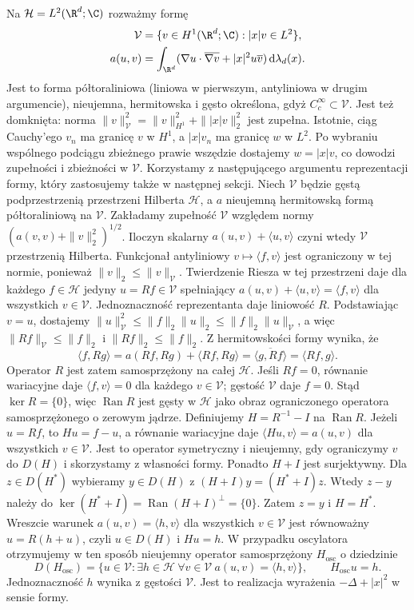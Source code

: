 \begin{przyklad}
Na $\mathcal H=L^2(\R^d;\C)$ rozważmy formę
\[
 \begin{split}
 \mathcal V&=\{v\in H^1(\R^d;\C): |x|v\in L^2\},\\
 a(u,v)&=\int_{\R^d}
   (\nabla u\cdot\overline{\nabla v}+|x|^2u\overline v)
       \,\mathrm d\lambda_d(x).
 \end{split}
\]
Jest to forma półtoraliniowa (liniowa w pierwszym,
antyliniowa w drugim argumencie), nieujemna,
hermitowska i gęsto określona,
gdyż $C_c^\infty\subset\mathcal V$.
Jest też domknięta: norma
$\|v\|_{\mathcal V}^2=\|v\|_{H^1}^2+\||x|v\|_2^2$
jest zupełna. Istotnie, ciąg Cauchy'ego $v_n$
ma granicę $v$ w $H^1$, a $|x|v_n$ ma granicę
$w$ w $L^2$. Po wybraniu wspólnego podciągu
zbieżnego prawie wszędzie dostajemy $w=|x|v$,
co dowodzi zupełności i zbieżności w $\mathcal V$.
Korzystamy z następującego argumentu reprezentacji
formy, który zastosujemy także w następnej sekcji.
Niech $\mathcal V$ będzie gęstą podprzestrzenią
przestrzeni Hilberta $\mathcal H$, a $a$ nieujemną
hermitowską formą półtoraliniową na $\mathcal V$.
Zakładamy zupełność $\mathcal V$ względem normy
$(a(v,v)+\|v\|_2^2)^{1/2}$. Iloczyn skalarny
$a(u,v)+\langle u,v\rangle$ czyni wtedy
$\mathcal V$ przestrzenią Hilberta.
Funkcjonał antyliniowy $v\mapsto\langle f,v\rangle$
jest ograniczony w tej normie, ponieważ
$\|v\|_2\le\|v\|_{\mathcal V}$. Twierdzenie Riesza
w tej przestrzeni daje dla każdego $f\in\mathcal H$
jedyny $u=Rf\in\mathcal V$ spełniający
$a(u,v)+\langle u,v\rangle=\langle f,v\rangle$
dla wszystkich $v\in\mathcal V$.
Jednoznaczność reprezentanta daje liniowość $R$.
Podstawiając $v=u$, dostajemy
$\|u\|_{\mathcal V}^2\le\|f\|_2\|u\|_2
\le\|f\|_2\|u\|_{\mathcal V}$,
a więc $\|Rf\|_{\mathcal V}\le\|f\|_2$ i
$\|Rf\|_2\le\|f\|_2$. Z hermitowskości formy
wynika, że
\[
 \langle f,Rg\rangle
 =a(Rf,Rg)+\langle Rf,Rg\rangle
 =\overline{\langle g,Rf\rangle}
 =\langle Rf,g\rangle.
\]
Operator $R$ jest zatem samosprzężony na całej
$\mathcal H$. Jeśli $Rf=0$, równanie wariacyjne
daje $\langle f,v\rangle=0$ dla każdego
$v\in\mathcal V$; gęstość $\mathcal V$ daje
$f=0$. Stąd $\ker R=\{0\}$, więc
$\operatorname{Ran}R$ jest gęsty w $\mathcal H$
jako obraz ograniczonego operatora samosprzężonego
o zerowym jądrze.
Definiujemy $H=R^{-1}-I$ na $\operatorname{Ran}R$.
Jeżeli $u=Rf$, to $Hu=f-u$, a równanie
wariacyjne daje $\langle Hu,v\rangle=a(u,v)$
dla wszystkich $v\in\mathcal V$. Jest to
operator symetryczny i nieujemny, gdy ograniczymy
$v$ do $D(H)$ i skorzystamy z własności formy.
Ponadto $H+I$ jest surjektywny.
Dla $z\in D(H^*)$ wybieramy $y\in D(H)$
z $(H+I)y=(H^*+I)z$. Wtedy $z-y$ należy
do $\ker(H^*+I)=\operatorname{Ran}(H+I)^\perp=\{0\}$.
Zatem $z=y$ i $H=H^*$.
Wreszcie warunek $a(u,v)=\langle h,v\rangle$
dla wszystkich $v\in\mathcal V$ jest równoważny
$u=R(h+u)$, czyli $u\in D(H)$ i $Hu=h$.
W przypadku oscylatora otrzymujemy w ten sposób
nieujemny operator samosprzężony
$H_{\mathrm{osc}}$ o dziedzinie
\[
 D(H_{\mathrm{osc}})=\{u\in\mathcal V:
 \exists h\in\mathcal H\ \forall v\in\mathcal V\
 a(u,v)=\langle h,v\rangle\},
 \qquad H_{\mathrm{osc}}u=h.
\]
Jednoznaczność $h$ wynika z gęstości $\mathcal V$.
Jest to realizacja wyrażenia $-\Delta+|x|^2$
w sensie formy.


\end{przyklad}

